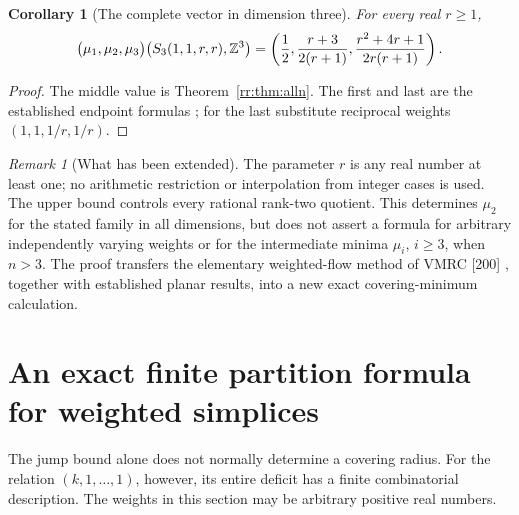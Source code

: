 \documentclass[11pt,a4paper]{article}
\newtheorem{corollary}[theorem]{Corollary}
\theoremstyle{remark}\newtheorem{remark}[theorem]{Remark}
\begin{document}
\begin{corollary}[The complete vector in dimension three]
\label{rr:cor:vector}
For every real $r\ge1$,
\[
 \bigl(\mu_1,\mu_2,\mu_3\bigr)\bigl(S_3(1,1,r,r),\mathbb Z^3\bigr)
 =\left(\frac12,\frac{r+3}{2(r+1)},
              \frac{r^2+4r+1}{2r(r+1)}\right).
\]
\end{corollary}
\begin{proof}
The middle value is Theorem~\ref{rr:thm:alln}.  The first and
last are the established endpoint formulas
\cite[Theorem 1.4 and the discussion after Conjecture 5.3]{CSS};
for the last substitute reciprocal weights $(1,1,1/r,1/r)$.
\end{proof}

\begin{remark}[What has been extended]
The parameter $r$ is any real number at least one; no arithmetic
restriction or interpolation from integer cases is used.  The
upper bound controls every rational rank-two quotient.  This
determines $\mu_2$ for the stated family in all dimensions, but
does not assert a formula for arbitrary independently varying
weights or for the intermediate minima $\mu_i$, $i\ge3$, when
$n>3$.  The proof transfers the elementary weighted-flow method
of VMRC [200] \cite{VMRC200}, together with established planar
results, into a new exact covering-minimum calculation.
\end{remark}


\section{An exact finite partition formula for weighted simplices}
\label{part:section}

The jump bound alone does not normally determine a covering radius.
For the relation $(k,1,\ldots,1)$, however, its entire deficit has a
finite combinatorial description.  The weights in this section may
be arbitrary positive real numbers.
\end{document}
